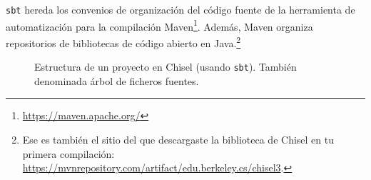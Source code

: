 \documentclass[%
    10pt,
    headinclude, footinclude=false,
    openright, %
    notitlepage,
    cleardoublepage=empty,
    headsepline,
    numbers=noenddot,
    bibliography=totoc, index=totoc,
    ]{scrbook}
\newcommand{\code}[1]{{\lstinline[basicstyle=\small\ttfamily]{#1}}}
\newcommand{\myref}[2]{\href{#1}{#2}}
\renewcommand{\myref}[2]{{#2}{\footnote{\url{#1}}}}
\begin{document}


\code{sbt} hereda los convenios de organización del código fuente de la herramienta de automatización para
la compilación \myref{https://maven.apache.org/}{Maven}. Además, Maven organiza repositorios de bibliotecas
de código abierto en Java.\footnote{Ese es también el sitio del que descargaste la biblioteca de Chisel en
tu primera compilación: \url{https://mvnrepository.com/artifact/edu.berkeley.cs/chisel3}.}

\begin{figure}
\caption{Estructura de un proyecto en Chisel (usando \code{sbt}). También denominada árbol de ficheros fuentes.}
\label{fig:folders}
\end{figure}

\end{document}
